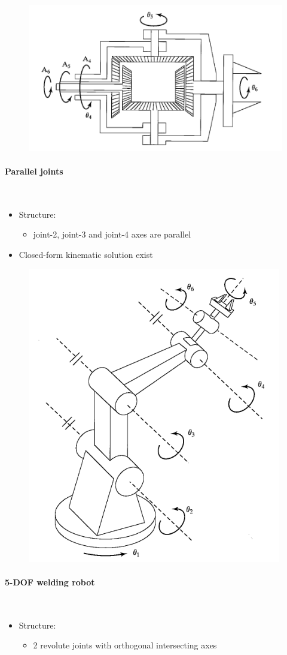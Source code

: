 \documentclass[10pt,a4paper]{article}
\begin{document}
\begin{figure}[H]
	\includegraphics[width=0.5\columnwidth]{imgs/wrist_orthogonal.png}
\end{figure}

\paragraph{Parallel joints} ~\\
\begin{itemize}
	\item Structure:
	\begin{itemize}
		\item joint-2, joint-3 and joint-4 axes are parallel
	\end{itemize}
	\item Closed-form kinematic solution exist
\end{itemize}

\begin{figure}[H]
	\includegraphics[width=0.5\columnwidth]{imgs/wrist_parallel.png}
\end{figure}

\paragraph{5-DOF welding robot} ~\\
\begin{itemize}
	\item Structure:
	\begin{itemize}
		\item 2 revolute joints with orthogonal intersecting axes
	\end{itemize}
\end{itemize}
\end{document}
